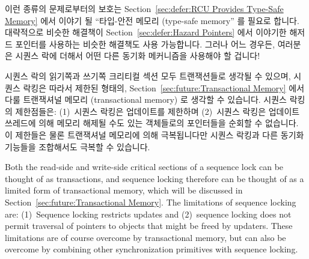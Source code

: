 {\begin{enumerate}

	\end{enumerate}

	이런 종류의 문제로부터의 보호는
	Section~\ref{sec:defer:RCU Provides Type-Safe Memory}
	에서 이야기 될 ``타입-안전 메모리 (type-safe memory'' 를 필요로 합니다.
	대략적으로 비슷한 해결책이
	Section~\ref{sec:defer:Hazard Pointers}
	에서 이야기한 해저드 포인터를 사용하는 비슷한 해결책도 사용 가능합니다.
	그러나 어느 경우든, 여러분은 시퀀스 락에 더해서 어떤 다른 동기화
	메커니즘을 사용해야 할 겁니다!

}\QuickQuizEnd

시퀀스 락의 읽기쪽과 쓰기쪽 크리티컬 섹션 모두 트랜잭션들로 생각될 수 있으며,
시퀀스 락킹은 따라서 제한된 형태의,
Section~\ref{sec:future:Transactional Memory} 에서 다룰 트랜잭셔널 메모리
(transactional memory) 로 생각할 수 있습니다.
시퀀스 락킹의 제한점들은: (1)~시퀀스 락킹은 업데이트를 제한하며 (2)~시퀀스
락킹은 업데이트 쓰레드에 의해 메모리 해제될 수도 있는 객체들로의 포인터들을
순회할 수 없습니다.
이 제한들은 물론 트랜잭셔널 메모리에 의해 극복됩니다만 시퀀스 락킹과 다른
동기화 기능들을 조합해서도 극복할 수 있습니다.

\iffalse

Both the read-side and write-side critical sections of a sequence lock
can be thought of as transactions, and sequence locking therefore
can be thought of as a limited form of transactional memory, which
will be discussed in Section~\ref{sec:future:Transactional Memory}.
The limitations of sequence locking are: (1)~Sequence locking restricts
updates and (2)~sequence locking does not permit traversal of pointers
to objects that might be freed by updaters.
These limitations are of course overcome by transactional memory, but
can also be overcome by combining other synchronization primitives
with sequence locking.


